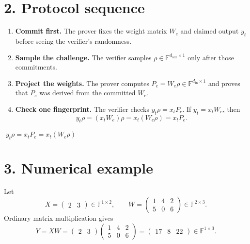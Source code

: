 \documentclass[10pt,a4paper]{article}
\begin{document}
\newpage

\section*{2. Protocol sequence}

\begin{enumerate}
  \item \textbf{\color{navy}Commit first.} The prover fixes the weight matrix $W_e$ and claimed output $y_t$
        before seeing the verifier's randomness.
  \item \textbf{\color{navy}Sample the challenge.} The verifier samples
        $\rho\in\mathbb F^{d_{\mathrm{out}}\times1}$ only after those commitments.
  \item \textbf{\color{navy}Project the weights.} The prover computes
        $P_e=W_e\rho\in\mathbb F^{d_{\mathrm{in}}\times1}$ and proves that $P_e$ was derived from the committed $W_e$.
  \item \textbf{\color{navy}Check one fingerprint.} The verifier checks $y_t\rho=x_tP_e$. If
        $y_t=x_tW_e$, then
        \[
          y_t\rho=(x_tW_e)\rho=x_t(W_e\rho)=x_tP_e.
        \]
\end{enumerate}

\begin{center}
  {\Large\bfseries\color{navy}$\boxed{\;y_t\rho=x_tP_e=x_t(W_e\rho)\;}$}
\end{center}

\section*{3. Numerical example}

Let
\[
X=\begin{pmatrix}2&3\end{pmatrix}\in\mathbb F^{1\times2},
\qquad
W=\begin{pmatrix}1&4&2\\5&0&6\end{pmatrix}\in\mathbb F^{2\times3}.
\]
Ordinary matrix multiplication gives
\[
Y=XW
=\begin{pmatrix}2&3\end{pmatrix}
 \begin{pmatrix}1&4&2\\5&0&6\end{pmatrix}
=\begin{pmatrix}17&8&22\end{pmatrix}
\in\mathbb F^{1\times3}.
\]
\end{document}

